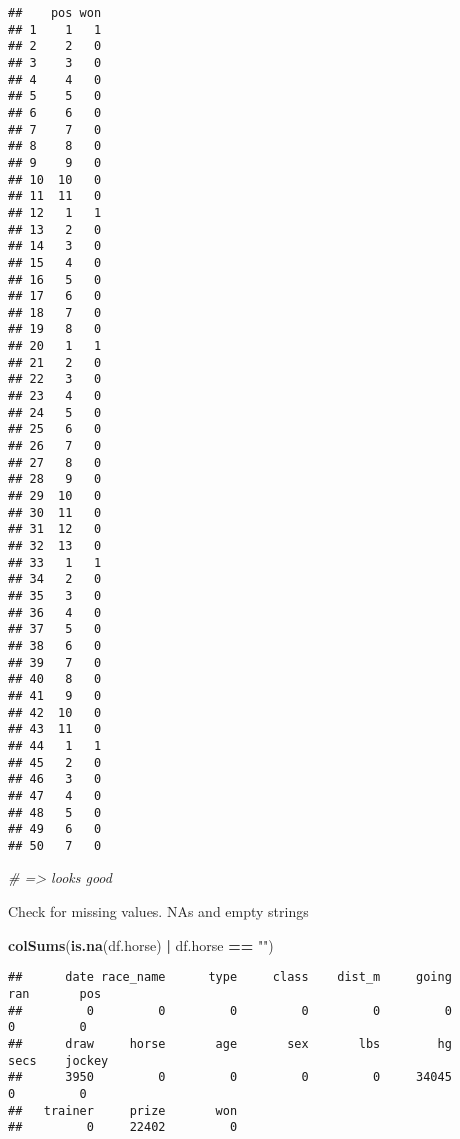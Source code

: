 \documentclass[
]{article}
\newenvironment{Shaded}{\begin{snugshade}}{\end{snugshade}}
\newcommand{\CommentTok}[1]{\textcolor[rgb]{0.56,0.35,0.01}{\textit{#1}}}
\newcommand{\DecValTok}[1]{\textcolor[rgb]{0.00,0.00,0.81}{#1}}
\newcommand{\FunctionTok}[1]{\textcolor[rgb]{0.13,0.29,0.53}{\textbf{#1}}}
\newcommand{\NormalTok}[1]{#1}
\newcommand{\OtherTok}[1]{\textcolor[rgb]{0.56,0.35,0.01}{#1}}
\newcommand{\SpecialCharTok}[1]{\textcolor[rgb]{0.81,0.36,0.00}{\textbf{#1}}}
\newcommand{\StringTok}[1]{\textcolor[rgb]{0.31,0.60,0.02}{#1}}
\begin{document}
\begin{Shaded}
\end{Shaded}

\begin{verbatim}
##    pos won
## 1    1   1
## 2    2   0
## 3    3   0
## 4    4   0
## 5    5   0
## 6    6   0
## 7    7   0
## 8    8   0
## 9    9   0
## 10  10   0
## 11  11   0
## 12   1   1
## 13   2   0
## 14   3   0
## 15   4   0
## 16   5   0
## 17   6   0
## 18   7   0
## 19   8   0
## 20   1   1
## 21   2   0
## 22   3   0
## 23   4   0
## 24   5   0
## 25   6   0
## 26   7   0
## 27   8   0
## 28   9   0
## 29  10   0
## 30  11   0
## 31  12   0
## 32  13   0
## 33   1   1
## 34   2   0
## 35   3   0
## 36   4   0
## 37   5   0
## 38   6   0
## 39   7   0
## 40   8   0
## 41   9   0
## 42  10   0
## 43  11   0
## 44   1   1
## 45   2   0
## 46   3   0
## 47   4   0
## 48   5   0
## 49   6   0
## 50   7   0
\end{verbatim}

\begin{Shaded}
\begin{Highlighting}[]
\CommentTok{\# =\textgreater{} looks good}
\end{Highlighting}
\end{Shaded}

Check for missing values. NAs and empty strings

\begin{Shaded}
\begin{Highlighting}[]
\FunctionTok{colSums}\NormalTok{(}\FunctionTok{is.na}\NormalTok{(df.horse) }\SpecialCharTok{|}\NormalTok{ df.horse }\SpecialCharTok{==} \StringTok{""}\NormalTok{)}
\end{Highlighting}
\end{Shaded}

\begin{verbatim}
##      date race_name      type     class    dist_m     going       ran       pos 
##         0         0         0         0         0         0         0         0 
##      draw     horse       age       sex       lbs        hg      secs    jockey 
##      3950         0         0         0         0     34045         0         0 
##   trainer     prize       won 
##         0     22402         0
\end{verbatim}
\end{document}
